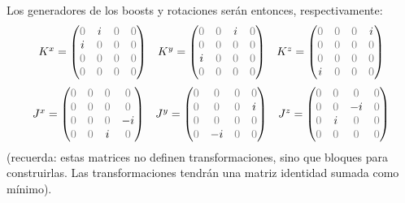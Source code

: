 \documentclass[]{article}
\numberwithin{equation}{section}
\begin{document}
Los generadores de los boosts y rotaciones serán entonces, respectivamente:
\begin{equation}
	\begin{matrix}
		K^x = \begin{pmatrix}
			\0 &i &\0 &\0\\
			i &\0 &\0 &\0\\
			\0 &\0 &\0 &\0\\
			\0 &\0 &\0 &\0
		\end{pmatrix} & 
		K^y = \begin{pmatrix}
		\0 &\0 &i &\0\\
		\0 &\0 &\0 &\0\\
		i &\0 &\0 &\0\\
		\0 &\0 &\0 &\0
		\end{pmatrix} &
		K^z = \begin{pmatrix}
		\0 &\0 &\0 &i\\
		\0 &\0 &\0 &\0\\
		\0 &\0 &\0 &\0\\
		i &\0 &\0 &\0
		\end{pmatrix}
	\end{matrix}
\end{equation}
\begin{equation}
	\begin{matrix}
		J^x = \begin{pmatrix}
			\0 &\0 &\0 &\0\\
			\0 &\0 &\0 &\0\\
			\0 &\0 &\0 &-i\\
			\0 &\0 &i &\0
		\end{pmatrix} & 
		J^y = \begin{pmatrix}
			\0 &\0 &\0 &\0\\
			\0 &\0 &\0 &i\\
			\0 &\0 &\0 &\0\\
			\0 &-i &\0 &\0
		\end{pmatrix} &
		J^z = \begin{pmatrix}
			\0 &\0 &\0 &\0\\
			\0 &\0 &-i &\0\\
			\0 &i &\0 &\0\\
			\0 &\0 &\0 &\0
		\end{pmatrix}
	\end{matrix}
\end{equation}
(recuerda: estas matrices no definen transformaciones, sino que bloques para construirlas. Las transformaciones tendrán una matriz identidad sumada como mínimo).
\end{document}

